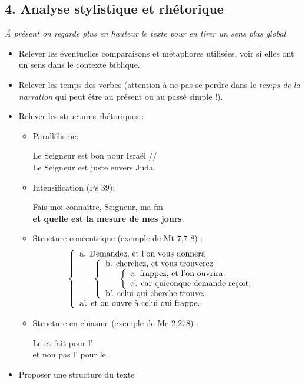 \subsection*{4. Analyse stylistique et rhétorique}
\textit{À présent on regarde plus en hauteur le texte pour en tirer un sens plus global.}
\begin{itemize}[label=]
\item Relever les éventuelles comparaisons et métaphores utilisées, voir si elles ont un sens dans le contexte biblique.
\item Relever les temps des verbes (attention à ne pas se perdre dans le \textit{temps de la narration} qui peut être au présent ou au passé simple !).
\item Relever les structures rhétoriques :
\begin{itemize}[label=]
\item Parallélisme:\\
\begin{siderules}Le Seigneur est bon pour Israël // \\
Le Seigneur est juste envers Juda. \end{siderules}
\item Intensification (Ps 39):\\
\begin{siderules}Fais-moi connaître, Seigneur, ma fin \\
\textbf{et quelle est la mesure de mes jours}.\end{siderules}
\item Structure concentrique (exemple de Mt 7,7-8) :\\
\[
\left\{ \begin{array}{ll} \text{a. Demandez, et l’on vous donnera}\\
\hspace*{0.5cm}~
\left\{ \begin{array}{ll} \text{b. cherchez, et vous trouverez}\\
\hspace*{0.5cm}~
\left\{ \begin{array}{ll} \text{c. frappez, et l’on ouvrira.}\\
\text{c’. car quiconque demande reçoit;}
\end{array}
\right. \\
\text{b’. celui qui cherche trouve;}
\end{array}
\right.\\
\text{a’. et on ouvre à celui qui frappe.}
\end{array}
\right.
\]
\item Structure en chiasme (exemple de Mc 2,278) :\\
\begin{siderules}Le  et fait pour l'\\
et non pas l' pour le . \end{siderules}
\end{itemize}
\item Proposer une structure du texte
\end{itemize}
